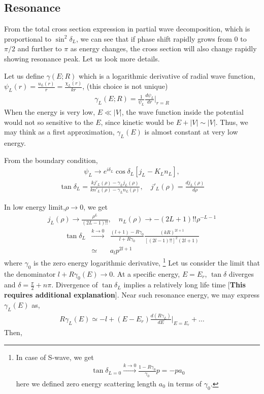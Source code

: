 \documentclass[10pt]{book}
\newcommand{\bea}{\begin{eqnarray}}
\newcommand{\eea}{\end{eqnarray}}
\newcommand{\no}{\nonumber \\}
\begin{document}
\subsection{Resonance}

From the total cross section expression in partial wave decomposition, 
which is proportional to $\sin^2\delta_L$, we can see that if phase shift rapidly grows
from 0 to $\pi/2$ and further to $\pi$ as energy changes, the cross section will also  
change rapidly showing resonance peak. 
Let us look more details. 

Let us define $\gamma(E;R)$ which is a logarithmic derivative of radial wave function,
$\psi_L(r)=\frac{u_L(r)}{r}=\frac{\chi_L(r)}{k r}$, (this choice is not unique)
\bea 
\gamma_L(E;R)=\frac{1}{\psi_L}{\frac{d \psi_L}{d r}}|_{r=R}
\eea 
When the energy is very low, $E\ll |V|$, the wave function inside the potential
would not so sensitive to the $E$, since kinetic would be $E+|V|\sim |V|$. 
Thus, we may think as a first approximation, $\gamma_L(E)$ is almost constant at
very low energy. 

From the boundary condition, 
\bea 
\psi_L\to e^{i\delta_L}\cos\delta_L[j_L- K_L n_L],
\eea 
\bea 
\tan\delta_L =\frac{k j'_L(\rho)-\gamma_L j_L(\rho)} {k n'_L(\rho)-\gamma_L n_L(\rho)}
,\quad j'_L(\rho)=\frac{d j_L(\rho)}{d\rho}
\eea 
 
In low energy limit,$\rho\to 0$,  we get
\bea 
j_L(\rho)\to \frac{\rho^L}{(2L-1)!!},\quad n_L(\rho)\to -(2L+1)!! \rho^{-L-1}
\eea 
\bea 
\tan\delta_{L}&\xrightarrow{k\to 0}& \frac{(l+1)-R \gamma_0}{l+R \gamma_0}
              \frac{(kR)^{2l+1}}{[(2l-1)!!]^2(2l+1)}  \no 
              &\simeq& a_l p^{2l+1}
\eea 
where $\gamma_0$ is the zero energy logarithmic derivative,  
\footnote{ 
In case of S-wave, we get
\bea 
\tan\delta_{L=0}\xrightarrow{k\to 0} \frac{1-R\gamma_0}{\gamma_0} p = - p a_0
\eea 
here we defined zero energy scattering length $a_0$ in terms of $\gamma_0$.
}
Let us consider the limit that the denominator $l+R\gamma_0(E)\to 0$. 
At a specific energy, $E=E_r$, $\tan\delta$ diverges and $\delta=\frac{\pi}{2}+n\pi$.
Divergence of $\tan\delta_L$ implies a relatively long life time
[{\bf This requires additional explanation}]. 
Near such resonance energy, we may express $\gamma_L(E)$ as,
\bea 
R \gamma_L(E)\simeq -l +(E-E_r)\frac{d( R\gamma_L)}{dE}|_{E=E_r}+\dots  
\eea 
Then, 
\end{document}
